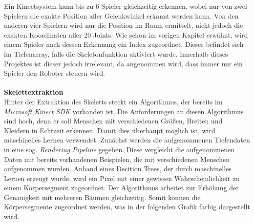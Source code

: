Ein Kinectsystem kann bis zu 6 Spieler gleichzeitig erkennen, wobei nur von zwei Spielern die exakte Position aller Gelenkwinkel erkannt werden kann. Von den anderen vier Spielern wird nur die Position im Raum ermittelt, nicht jedoch die exakten Koordinaten aller 20 Joints. Wie schon im vorigen Kapitel erwähnt, wird einem Spieler nach dessen Erkennung ein Index zugeordnet. Dieser befindet sich im Tiefenarray, falls die Skeletonfunktion aktiviert wurde. Innerhalb dieses Projektes ist dieser jedoch irrelevant, da angenommen wird, dass immer nur ein Spieler
den Roboter steuern wird.\\ \\
\textbf{Skelettextraktion}\\
Hinter der Extraktion des Skeletts steckt ein Algorithmus, der bereits im \textit{Microsoft Kinect SDK} vorhanden ist. 
Die Anforderungen an diesen Algorithmus sind hoch, denn er soll Menschen mit verschiedenen Größen,
Breiten und Kleidern in Echtzeit erkennen.
Damit dies überhaupt möglich ist, wird maschinelles Lernen verwendet. Zunächst werden die aufgenommenen Tiefendaten in eine sog. \textit{Rendering Pipeline}\cite{pdf:realtime_human_pose} gegeben. Diese vergleicht die aufgenommenen Daten mit bereits
vorhandenen Beispielen, die mit verschiedenen Menschen aufgenommen wurden. Anhand eines Decition Trees, der durch maschinelles Lernen erzeugt wurde, wird ein Pixel mit einer gewissen Wahrscheinlichkeit zu einem Körpersegment zugeordnet. Der Algorithmus arbeitet zur Erhöhung der Genauigkeit mit mehreren Bäumen gleichzeitig. Somit können die Körpersegmente zugeordnet werden, was in der folgenden Grafik farbig dargestellt wird.

